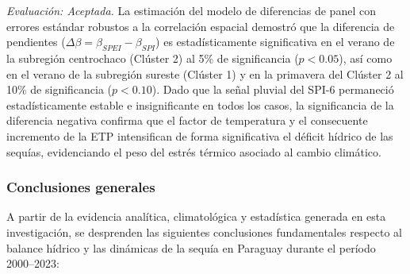 \begin{itemize}
    \textit{Evaluación: Aceptada.} La estimación del modelo de diferencias de panel con errores estándar robustos a la correlación espacial demostró que la diferencia de pendientes ($\Delta \beta = \beta_{SPEI} - \beta_{SPI}$) es estadísticamente significativa en el verano de la subregión centrochaco (Clúster 2) al 5\% de significancia ($p < 0.05$), así como en el verano de la subregión sureste (Clúster 1) y en la primavera del Clúster 2 al 10\% de significancia ($p < 0.10$). Dado que la señal pluvial del SPI-6 permaneció estadísticamente estable e insignificante en todos los casos, la significancia de la diferencia negativa confirma que el factor de temperatura y el consecuente incremento de la ETP intensifican de forma significativa el déficit hídrico de las sequías, evidenciando el peso del estrés térmico asociado al cambio climático.
\end{itemize}

\subsubsection{Conclusiones generales}

A partir de la evidencia analítica, climatológica y estadística generada en esta investigación, se desprenden las siguientes conclusiones fundamentales respecto al balance hídrico y las dinámicas de la sequía en Paraguay durante el período 2000--2023:

